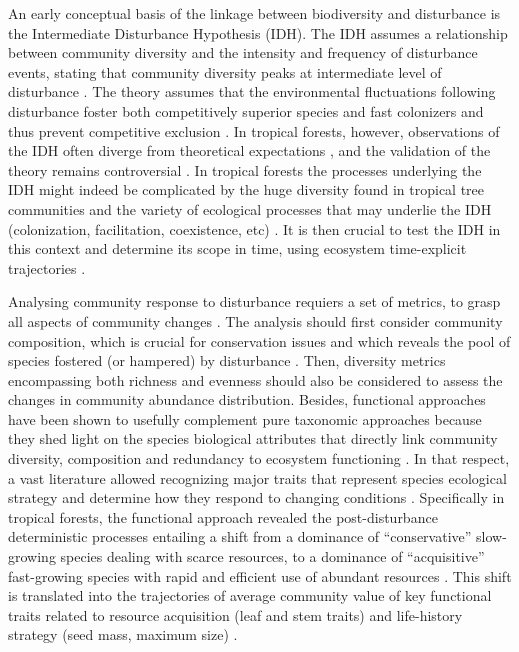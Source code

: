 \documentclass[fleqn,10pt]{ArtEcoFoG} %
\begin{document}
An early conceptual basis of the linkage between biodiversity and
disturbance is the Intermediate Disturbance Hypothesis (IDH). The IDH
assumes a relationship between community diversity and the intensity and
frequency of disturbance events, stating that community diversity peaks
at intermediate level of disturbance \citep{Connell1978}. The theory
assumes that the environmental fluctuations following disturbance foster
both competitively superior species and fast colonizers and thus prevent
competitive exclusion \citep{Shea2004, Pulsford2016}. In tropical
forests, however, observations of the IDH often diverge from theoretical
expectations \citep{Hugues2007, Sheil2003, Norden2017}, and the
validation of the theory remains controversial
\citep{Hubbell2001, Fox2013, Sheil2013}. In tropical forests the
processes underlying the IDH might indeed be complicated by the huge
diversity found in tropical tree communities and the variety of
ecological processes that may underlie the IDH (colonization,
facilitation, coexistence, etc)
\citep{Lindenmayer2012, Garcia_florez2017}. It is then crucial to test
the IDH in this context and determine its scope in time, using ecosystem
time-explicit trajectories \citep{Sheil2003, Shea2004}.

Analysing community response to disturbance requiers a set of metrics,
to grasp all aspects of community changes
\citep{Sheil2003, Shea2004, Mayfield2010}. The analysis should first
consider community composition, which is crucial for conservation issues
and which reveals the pool of species fostered (or hampered) by
disturbance \citep{Lavorel2002, Bellwood2006}. Then, diversity metrics
encompassing both richness and evenness should also be considered to
assess the changes in community abundance distribution. Besides,
functional approaches have been shown to usefully complement pure
taxonomic approaches because they shed light on the species biological
attributes that directly link community diversity, composition and
redundancy to ecosystem functioning \citep{Violle2007b, Baraloto2012a}.
In that respect, a vast literature allowed recognizing major traits that
represent species ecological strategy and determine how they respond to
changing conditions \citep{Diaz2005}. Specifically in tropical forests,
the functional approach revealed the post-disturbance deterministic
processes entailing a shift from a dominance of ``conservative''
slow-growing species dealing with scarce resources, to a dominance of
``acquisitive'' fast-growing species with rapid and efficient use of
abundant resources \citep{Rees2001, Reich2014, Herault2011}. This shift
is translated into the trajectories of average community value of key
functional traits related to resource acquisition (leaf and stem traits)
and life-history strategy (seed mass, maximum size)
\citep{Wright2004, TerSteege2006, Westoby2006a, Chave2009b}.
\end{document}
